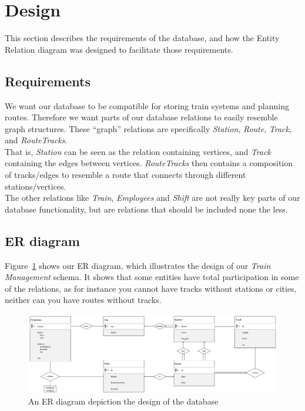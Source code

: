 \section{Design} \label{sec:design}

This section describes the requirements of the database, and how the Entity 
Relation diagram was designed to facilitate those requirements. 

\subsection{Requirements}

We want our database to be compatible for storing train systems and planning 
routes. Therefore we want parts of our database relations to easily resemble 
graph structures. These ``graph'' relations are specifically \emph{Station}, 
\emph{Route}, \emph{Track}, and \emph{RouteTracks}.\\
That is, \emph{Station} can be seen as the relation containing vertices, and \emph{Track} containing the edges between vertices. \emph{RouteTracks} then contains a composition of tracks/edges to resemble a route that connects through different stations/vertices.\\[12pt]
The other relations like \emph{Train}, \emph{Employees} and \emph{Shift} are 
not really key parts of our database functionality, but are relations that 
should be included none the less.


\subsection{ER diagram}
Figure~\ref{fig:ER} shows our ER diagram, which illustrates the design of our 
\emph{Train Management} schema. It shows that some entities have total 
participation in some of the relations, as for instance you cannot have tracks 
without stations or cities, neither can you have routes without tracks.

\newpage
\begin{figure}[ht!]
    \centering
    \includegraphics[angle=90,origin=c,width=.4\textwidth]{img/Handwritten_ER}
    \caption{An ER diagram depiction the design of the database}
    \label{fig:ER}
\end{figure}


